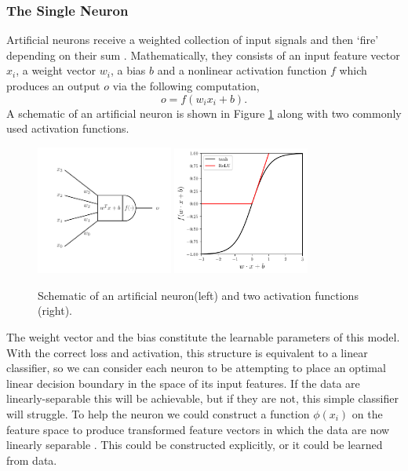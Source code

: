 \subsubsection{The Single Neuron}
Artificial neurons receive a weighted collection of input signals and then `fire' depending on their sum \cite{CS231n}. Mathematically, they consists of an input feature vector $x_{i}$, a weight vector $w_{i}$, a bias $b$ and a nonlinear activation function $f$ which produces an output $o$ via the following computation,
\begin{equation}
    o = f(w_{i}x_{i} + b).
\end{equation}
A schematic of an artificial neuron is shown in Figure \ref{fig:machine_learning:neuron_and_activation} along with two commonly used activation functions. 
\begin{figure}[h!]
    \begin{center}
        \includegraphics[width=0.4\textwidth]{figures/machine_learning/neuron.pdf}
        \includegraphics[width=0.4\textwidth]{figures/machine_learning/activation_functions.pdf}
    \end{center}
    \caption{Schematic of an artificial neuron(left) and two activation functions (right).}
        \label{fig:machine_learning:neuron_and_activation}
\end{figure}
The weight vector and the bias constitute the learnable parameters of this model. 
With the correct loss and activation, this structure is equivalent to a linear classifier, so we can consider each neuron to be attempting to place an optimal linear decision boundary in the space of its input features. 
If the data are linearly-separable this will be achievable, but if they are not, this simple classifier will struggle. 
To help the neuron we could construct a function $\phi(x_{i})$ on the feature space to produce transformed feature vectors in which the data are now linearly separable \cite{DeepLearningBook}. 
This could be constructed explicitly, or it could be learned from data. 



